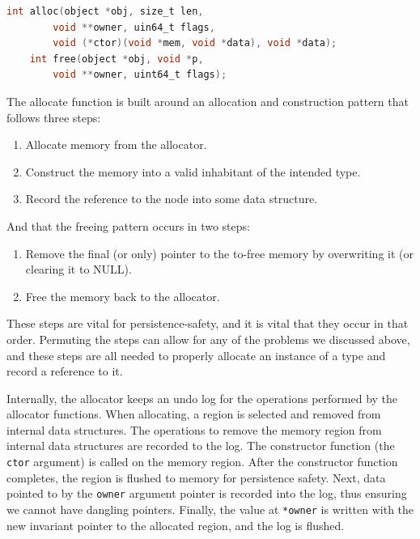 \begin{lstlisting}[language=C]
    int alloc(object *obj, size_t len,
        void **owner, uin64_t flags,
        void (*ctor)(void *mem, void *data), void *data);
    int free(object *obj, void *p,
        void **owner, uint64_t flags);
\end{lstlisting}

The allocate function is built around an allocation and construction pattern that follows three steps:
\begin{enumerate}
    \item Allocate memory from the allocator.
    \item Construct the memory into a valid inhabitant of the intended type.
    \item Record the reference to the node into some data structure.
\end{enumerate}

And that the freeing pattern occurs in two steps:

\begin{enumerate}
    \item Remove the final (or only) pointer to the to-free memory by overwriting it (or clearing it to NULL).
    \item Free the memory back to the allocator.
\end{enumerate}

These steps are vital for persistence-safety, and it is vital that they occur in that order. Permuting the steps can
allow for any of the problems we discussed above, and these steps are all needed to properly allocate an instance of
a type and record a reference to it.

Internally, the allocator keeps an undo log for the operations performed by the allocator functions. When allocating, a
region is selected and removed from internal data structures. The operations to remove the memory region from internal
data structures are recorded to the log. The constructor function (the \texttt{ctor} argument) is called on the memory region. After the constructor
function completes, the region is flushed to memory for persistence safety. Next, data pointed to by the \texttt{owner}
argument pointer is recorded into the log, thus ensuring we cannot have dangling pointers. Finally, the value at
\texttt{*owner} is written with the new invariant pointer to the allocated region, and the log is flushed.

